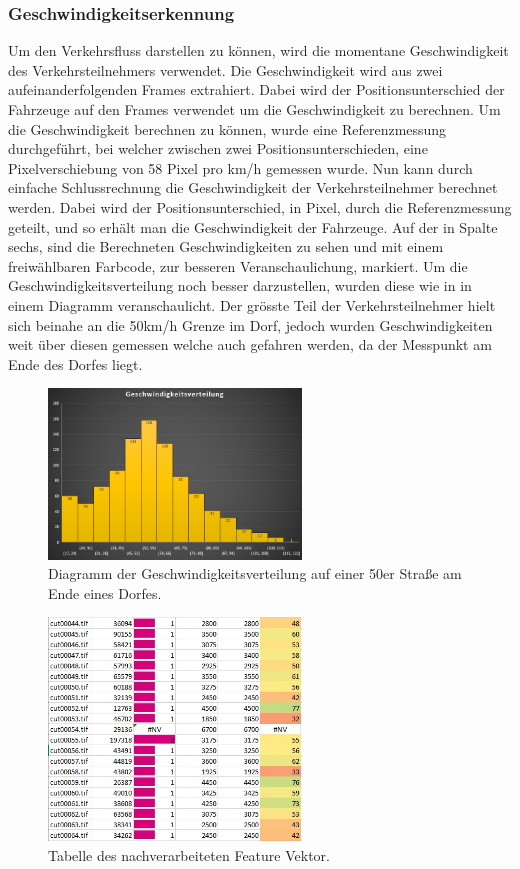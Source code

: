 \subsubsection{Geschwindigkeitserkennung}
Um den Verkehrsfluss darstellen zu können, wird die momentane Geschwindigkeit des Verkehrsteilnehmers verwendet. Die Geschwindigkeit wird aus zwei aufeinanderfolgenden Frames extrahiert. Dabei wird der Positionsunterschied der Fahrzeuge auf den Frames verwendet um die Geschwindigkeit zu berechnen. Um die Geschwindigkeit berechnen zu können, wurde eine Referenzmessung durchgeführt, bei welcher zwischen zwei Positionsunterschieden, eine Pixelverschiebung von 58 Pixel pro km/h gemessen wurde. Nun kann durch einfache Schlussrechnung die Geschwindigkeit der Verkehrsteilnehmer berechnet werden. Dabei wird der Positionsunterschied, in Pixel, durch die Referenzmessung geteilt, und so erhält man die Geschwindigkeit der Fahrzeuge. Auf der  in Spalte sechs, sind die Berechneten Geschwindigkeiten zu sehen und mit einem freiwählbaren Farbcode, zur besseren Veranschaulichung, markiert. Um die Geschwindigkeitsverteilung noch besser darzustellen, wurden diese wie in  in einem Diagramm veranschaulicht. Der grösste Teil der Verkehrsteilnehmer hielt sich beinahe an die 50km/h Grenze im Dorf, jedoch wurden Geschwindigkeiten weit über diesen gemessen welche auch gefahren werden, da der Messpunkt am Ende des Dorfes liegt.

\begin{figure}[H]
  \centering
  \includegraphics[width=0.6\textwidth]{Resultate/GeschwDiagramm.jpg} 
  \caption{Diagramm der Geschwindigkeitsverteilung auf einer 50er Straße am Ende eines Dorfes.}
  \label{bGeschwDiagramm}
\end{figure}


\begin{figure}[H]
  \centering
  \includegraphics[width=0.6\textwidth]{Resultate/Nachverarbeitung.jpg} 
  \caption{Tabelle des nachverarbeiteten Feature Vektor.}
  \label{bNachverarbeitung}
\end{figure}